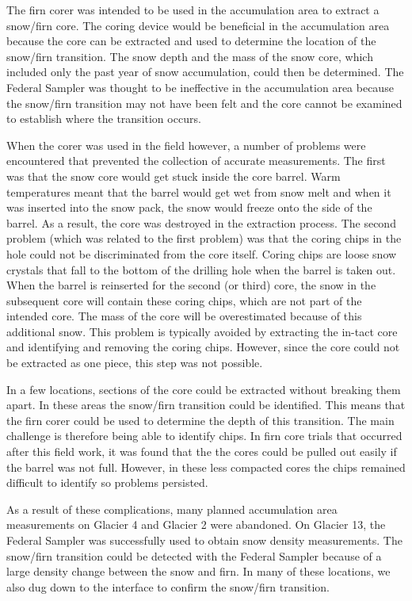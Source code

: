 \documentclass{sfuthesis}
\begin{document}
The firn corer was intended to be used in the accumulation area to extract a snow/firn core. The coring device would be beneficial in the accumulation area because the core can be extracted and used to determine the location of the snow/firn transition. The snow depth and the mass of the snow core, which included only the past year of snow accumulation, could then be determined. The Federal Sampler was thought to be ineffective in the accumulation area because the snow/firn transition may not have been felt and the core cannot be examined to establish where the transition occurs.

When the corer was used in the field however, a number of problems were encountered that prevented the collection of accurate measurements. The first was that the snow core would get stuck inside the core barrel. Warm temperatures meant that the barrel would get wet from snow melt and when it was inserted into the snow pack, the snow would freeze onto the side of the barrel. As a result, the core was destroyed in the extraction process. The second problem (which was related to the first problem) was that the coring chips in the hole could not be discriminated from the core itself. Coring chips are loose snow crystals that fall to the bottom of the drilling hole when the barrel is taken out. When the barrel is reinserted for the second (or third) core, the snow in the subsequent core will contain these coring chips, which are not part of the intended core. The mass of the core will be overestimated because of this additional snow. This problem is typically avoided by extracting the in-tact core and identifying and removing the coring chips. However, since the core could not be extracted as one piece, this step was not possible. 

In a few locations, sections of the core could be extracted without breaking them apart. In these areas the snow/firn transition could be identified. This means that the firn corer could be used to determine the depth of this transition. The main challenge is therefore being able to identify chips. In firn core trials that occurred after this field work, it was found that the the cores could be pulled out easily if the barrel was not full. However, in these less compacted cores the chips remained difficult to identify so problems persisted. 

As a result of these complications, many planned accumulation area measurements on Glacier 4 and Glacier 2 were abandoned. On Glacier 13, the Federal Sampler was successfully used to obtain snow density measurements. The snow/firn transition could be detected with the Federal Sampler because of a large density change between the snow and firn. In many of these locations, we also dug down to the interface to confirm the snow/firn transition.
\end{document}
